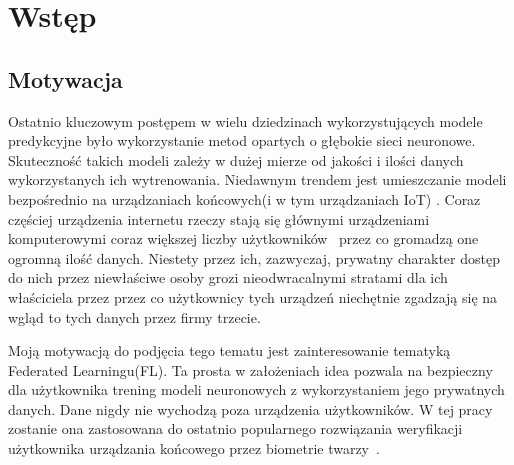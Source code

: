 \newpage
\section{Wstęp}

\subsection{Motywacja}

Ostatnio kluczowym postępem w wielu dziedzinach wykorzystujących modele predykcyjne było
wykorzystanie metod opartych o głębokie sieci neuronowe. Skuteczność takich modeli zależy w dużej
mierze od jakości i ilości danych wykorzystanych ich wytrenowania. Niedawnym trendem jest umieszczanie modeli bezpośrednio na urządzaniach końcowych(i w tym urządzaniach IoT) \cite{EdgeFacebook}. Coraz częściej urządzenia internetu rzeczy stają się głównymi urządzeniami komputerowymi coraz większej liczby
użytkowników~\cite{SmartphoneOwenrship,SmartphoneOwenrshipv2} przez co gromadzą one ogromną ilość
danych. Niestety przez ich, zazwyczaj, prywatny charakter dostęp do nich przez niewłaściwe osoby grozi nieodwracalnymi stratami dla ich właściciela przez przez co użytkownicy tych urządzeń niechętnie zgadzają się na wgląd to tych danych przez firmy trzecie.

Moją motywacją do podjęcia tego tematu jest zainteresowanie tematyką Federated Learningu(FL). Ta
prosta w założeniach idea pozwala na bezpieczny dla użytkownika trening modeli neuronowych z
wykorzystaniem jego prywatnych danych. Dane nigdy nie wychodzą poza urządzenia użytkowników. W
tej pracy zostanie ona zastosowana do ostatnio popularnego rozwiązania weryfikacji użytkownika
urządzania końcowego przez biometrie twarzy~\cite{FaceBiometic}.



